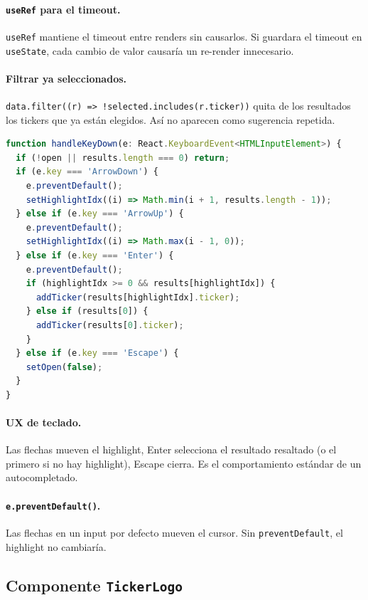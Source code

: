 \documentclass[11pt,a4paper]{book}
\begin{document}
\paragraph{\texttt{useRef} para el timeout.} \texttt{useRef} mantiene el timeout entre renders sin causarlos. Si guardara el timeout en \texttt{useState}, cada cambio de valor causaría un re-render innecesario.

\paragraph{Filtrar ya seleccionados.} \texttt{data.filter((r) => !selected.includes(r.ticker))} quita de los resultados los tickers que ya están elegidos. Así no aparecen como sugerencia repetida.

\begin{lstlisting}[language=TypeScript,caption={Manejo de teclado}]
function handleKeyDown(e: React.KeyboardEvent<HTMLInputElement>) {
  if (!open || results.length === 0) return;
  if (e.key === 'ArrowDown') {
    e.preventDefault();
    setHighlightIdx((i) => Math.min(i + 1, results.length - 1));
  } else if (e.key === 'ArrowUp') {
    e.preventDefault();
    setHighlightIdx((i) => Math.max(i - 1, 0));
  } else if (e.key === 'Enter') {
    e.preventDefault();
    if (highlightIdx >= 0 && results[highlightIdx]) {
      addTicker(results[highlightIdx].ticker);
    } else if (results[0]) {
      addTicker(results[0].ticker);
    }
  } else if (e.key === 'Escape') {
    setOpen(false);
  }
}
\end{lstlisting}

\paragraph{UX de teclado.} Las flechas mueven el highlight, Enter selecciona el resultado resaltado (o el primero si no hay highlight), Escape cierra. Es el comportamiento estándar de un autocompletado.

\paragraph{\texttt{e.preventDefault()}.} Las flechas en un input por defecto mueven el cursor. Sin \texttt{preventDefault}, el highlight no cambiaría.

\subsection{Componente \texttt{TickerLogo}}
\end{document}
